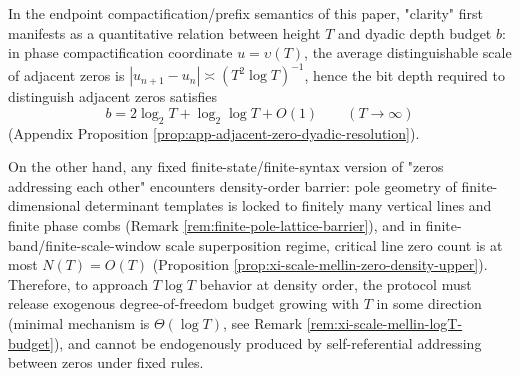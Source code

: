 \begin{remark}\label{rem:xi-resolution-height-finite-state-barrier}
In the endpoint compactification/prefix semantics of this paper, "clarity" first manifests as a quantitative relation between height \(T\) and dyadic depth budget \(b\): in phase compactification coordinate \(u=\upsilon(T)\), the average distinguishable scale of adjacent zeros is \(|u_{n+1}-u_n|\asymp (T^{2}\log T)^{-1}\), hence the bit depth required to distinguish adjacent zeros satisfies
\[
b=2\log_{2}T+\log_{2}\log T+O(1)
\qquad(T\to\infty)
\]
(Appendix Proposition \ref{prop:app-adjacent-zero-dyadic-resolution}).
\par
On the other hand, any fixed finite-state/finite-syntax version of "zeros addressing each other" encounters density-order barrier: pole geometry of finite-dimensional determinant templates is locked to finitely many vertical lines and finite phase combs (Remark \ref{rem:finite-pole-lattice-barrier}), and in finite-band/finite-scale-window scale superposition regime, critical line zero count is at most \(N(T)=O(T)\) (Proposition \ref{prop:xi-scale-mellin-zero-density-upper}).
Therefore, to approach \(T\log T\) behavior at density order, the protocol must release exogenous degree-of-freedom budget growing with \(T\) in some direction (minimal mechanism is \(\Theta(\log T)\), see Remark \ref{rem:xi-scale-mellin-logT-budget}), and cannot be endogenously produced by self-referential addressing between zeros under fixed rules.
\end{remark}

